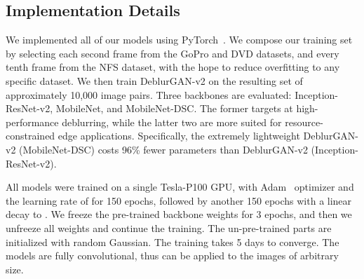 \documentclass[10pt,twocolumn,letterpaper]{article}
\begin{document}
\subsection{Implementation Details}
\vspace{-0.5em}
We implemented all of our models using PyTorch~\cite{pytorch}. We compose our training set by selecting each second frame from the GoPro and DVD datasets, and every tenth frame from the NFS dataset, with the hope to reduce overfitting to any specific dataset. We then train DeblurGAN-v2 on the resulting set of approximately 10,000 image pairs. Three backbones are evaluated: Inception-ResNet-v2, MobileNet, and MobileNet-DSC. The former targets at high-performance deblurring, while the latter two are more suited for resource-constrained edge applications. Specifically, the extremely lightweight DeblurGAN-v2 (MobileNet-DSC) costs 96\% fewer parameters than DeblurGAN-v2 (Inception-ResNet-v2). 

All models were trained on a single Tesla-P100 GPU, with Adam~\cite{ADAM} optimizer and the learning rate of  for 150 epochs, followed by another 150 epochs with a linear decay to . We freeze the pre-trained backbone weights for 3 epochs, and then we unfreeze all weights and continue the training. The un-pre-trained parts are initialized with random Gaussian. The training takes 5 days to converge. The models are fully convolutional, thus can be applied to the images of arbitrary size. 
\end{document}
